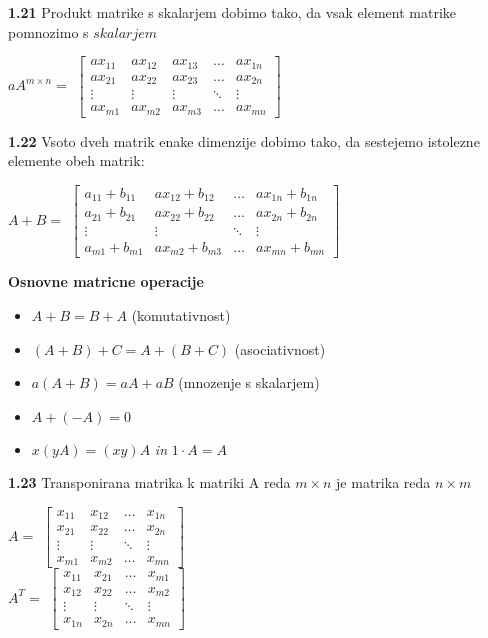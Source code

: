\documentclass{article}
\begin{document}
\begin{multicols}{4}
	\textbf{1.21} Produkt matrike s skalarjem dobimo tako, da
	vsak element matrike pomnozimo s $skalarjem$
	\begin{center}
		$aA^{m \times n} =$
		$\begin{bmatrix}
				ax_{11} & ax_{12} & ax_{13} & \dots  & ax_{1n} \\
				ax_{21} & ax_{22} & ax_{23} & \dots  & ax_{2n} \\
				\vdots  & \vdots  & \vdots  & \ddots & \vdots  \\
				ax_{m1} & ax_{m2} & ax_{m3} & \dots  & ax_{mn}
			\end{bmatrix}$
	\end{center}

	\textbf{1.22} Vsoto dveh matrik enake dimenzije dobimo tako,
	da sestejemo istolezne elemente obeh matrik:
	\begin{center}
		$A + B =$
		$\begin{bmatrix}
				a_{11} + b_{11} & ax_{12} + b_{12} & \dots  & ax_{1n} + b_{1n} \\
				a_{21} + b_{21} & ax_{22} + b_{22} & \dots  & ax_{2n} + b_{2n} \\
				\vdots          & \vdots           & \ddots & \vdots           \\
				a_{m1} + b_{m1} & ax_{m2} + b_{m3} & \dots  & ax_{mn} + b_{mn}
			\end{bmatrix}$
	\end{center}

	\textbf{Osnovne matricne operacije}
	\begin{itemize}
		\item $A + B = B + A$ (komutativnost)
		\item $(A + B) + C = A + (B + C)$ (asociativnost)
		\item $a(A + B) = aA + aB$ (mnozenje s skalarjem)
		\item $A + (-A) = 0$
		\item $x(yA) = (xy)A$ \textit{in} $1 \cdot A = A$
	\end{itemize}

	\textbf{1.23} Transponirana matrika k matriki A reda $m \times n$
	je matrika reda $n \times m$
	\begin{center}
		$A =$
		$\begin{bmatrix}
				x_{11} & x_{12} & \dots  & x_{1n} \\
				x_{21} & x_{22} & \dots  & x_{2n} \\
				\vdots & \vdots & \ddots & \vdots \\
				x_{m1} & x_{m2} & \dots  & x_{mn}
			\end{bmatrix}$\\
		\smallskip
		$A^{T} =$
		$\begin{bmatrix}
				x_{11} & x_{21} & \dots  & x_{m1} \\
				x_{12} & x_{22} & \dots  & x_{m2} \\
				\vdots & \vdots & \ddots & \vdots \\
				x_{1n} & x_{2n} & \dots  & x_{mn}
			\end{bmatrix}$
	\end{center}


\end{multicols}
\end{document}
